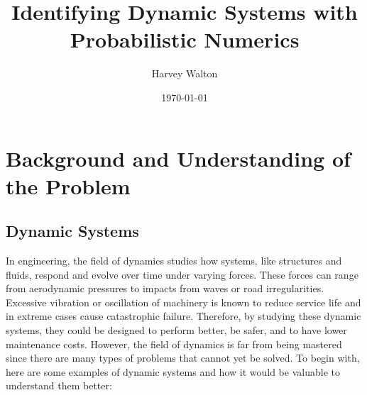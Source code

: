 \documentclass[12pt]{article}
\title{Identifying Dynamic Systems with Probabilistic Numerics}
\author{Harvey Walton}
\date{\today}
\begin{document}

    \thispagestyle{empty}
    

    \printnomenclature

    \newpage
    \tableofcontents
    \newpage


    \section{Background and Understanding of the Problem}

    \subsection{Dynamic Systems}
    In engineering, the field of dynamics studies how systems, like structures and fluids, respond and evolve over time under varying forces.
    These forces can range from aerodynamic pressures to impacts from waves or road irregularities.
    Excessive vibration or oscillation of machinery is known to reduce service life and in extreme cases cause catastrophic failure.
    Therefore, by studying these dynamic systems, they could be designed to perform better, be safer, and to have lower maintenance costs.
    However, the field of dynamics is far from being mastered since there are many types of problems that cannot yet be solved.
    To begin with, here are some examples of dynamic systems and how it would be valuable to understand them better:
\end{document}

